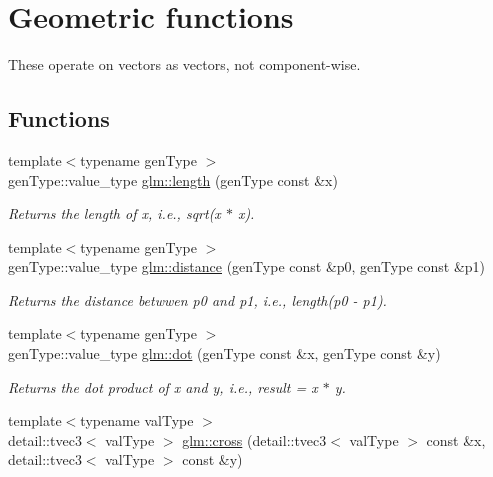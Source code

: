 \hypertarget{group__core__func__geometric}{\section{Geometric functions}
\label{group__core__func__geometric}
}


These operate on vectors as vectors, not component-\/wise.  


\subsection*{Functions}
\begin{DoxyCompactItemize}
\item 
{\footnotesize template$<$typename gen\-Type $>$ }\\gen\-Type\-::value\-\_\-type \hyperlink{group__core__func__geometric_ga282360c8bb80b80d3c7f5bc00766d873}{glm\-::length} (gen\-Type const \&x)
\begin{DoxyCompactList}\small\item\em Returns the length of x, i.\-e., sqrt(x $\ast$ x). \end{DoxyCompactList}\item 
{\footnotesize template$<$typename gen\-Type $>$ }\\gen\-Type\-::value\-\_\-type \hyperlink{group__core__func__geometric_ga3fac0e61144f60184d961dd156709dd3}{glm\-::distance} (gen\-Type const \&p0, gen\-Type const \&p1)
\begin{DoxyCompactList}\small\item\em Returns the distance betwwen p0 and p1, i.\-e., length(p0 -\/ p1). \end{DoxyCompactList}\item 
{\footnotesize template$<$typename gen\-Type $>$ }\\gen\-Type\-::value\-\_\-type \hyperlink{group__core__func__geometric_ga7a31d2864eccfe665409e3b44f5e6e8d}{glm\-::dot} (gen\-Type const \&x, gen\-Type const \&y)
\begin{DoxyCompactList}\small\item\em Returns the dot product of x and y, i.\-e., result = x $\ast$ y. \end{DoxyCompactList}\item 
{\footnotesize template$<$typename val\-Type $>$ }\\detail\-::tvec3$<$ val\-Type $>$ \hyperlink{group__core__func__geometric_gaa127ddc9d38f715125f91742d399eb6f}{glm\-::cross} (detail\-::tvec3$<$ val\-Type $>$ const \&x, detail\-::tvec3$<$ val\-Type $>$ const \&y)

\end{DoxyCompactItemize}

